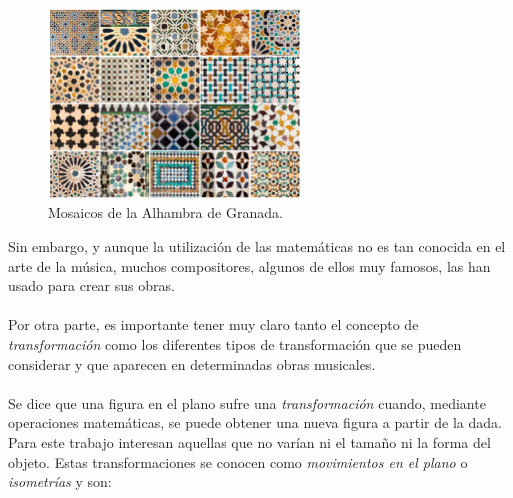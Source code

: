 \documentclass[a4paper, openright, 11pt, titlepage]{report}
\theoremstyle{definition}\newtheorem{defin}[propo]{Definition}
\theoremstyle{definition}\newtheorem{obser}[propo]{Remark}
\theoremstyle{definition}\newtheorem{ejem}[propo]{Ejemplo}
\theoremstyle{definition}\newtheorem{algoritmo}[propo]{Algoritmo}
\begin{document}
\begin{figure}[H]
    \centering
    \includegraphics[width = 0.6\textwidth]{alhambra.png}
    \caption{Mosaicos de la Alhambra de Granada.}
\end{figure}
Sin embargo, y aunque la utilización de las matemáticas no es tan conocida en el arte de la música, muchos compositores, algunos de ellos muy famosos, las han usado para crear sus obras.\\\\
Por otra parte, es importante tener muy claro tanto el concepto de \textit{transformación} como los diferentes tipos de transformación que se pueden considerar y que aparecen en determinadas obras musicales.\\\\
Se dice que una figura en el plano sufre una \textit{transformación} cuando, mediante operaciones matemáticas, se puede obtener una nueva figura a partir de la dada. Para este trabajo interesan aquellas que no varían ni el tamaño ni la forma del objeto. Estas transformaciones se conocen como \textit{movimientos en el plano} o \textit{isometrías} y son:
\end{document}
